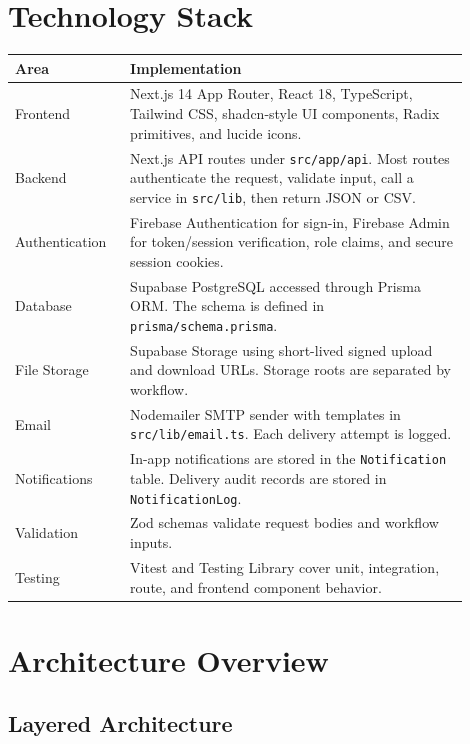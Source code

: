 \documentclass[11pt,a4paper]{article}
\newcommand{\code}[1]{\texttt{#1}}
\newcommand{\file}[1]{\texttt{#1}}
\begin{document}
\newpage

\section{Technology Stack}

\begin{longtable}{p{0.22\linewidth} p{0.68\linewidth}}
\toprule
\textbf{Area} & \textbf{Implementation} \\
\midrule
Frontend & Next.js 14 App Router, React 18, TypeScript, Tailwind CSS, shadcn-style UI components, Radix primitives, and lucide icons. \\
Backend & Next.js API routes under \file{src/app/api}. Most routes authenticate the request, validate input, call a service in \file{src/lib}, then return JSON or CSV. \\
Authentication & Firebase Authentication for sign-in, Firebase Admin for token/session verification, role claims, and secure session cookies. \\
Database & Supabase PostgreSQL accessed through Prisma ORM. The schema is defined in \file{prisma/schema.prisma}. \\
File Storage & Supabase Storage using short-lived signed upload and download URLs. Storage roots are separated by workflow. \\
Email & Nodemailer SMTP sender with templates in \file{src/lib/email.ts}. Each delivery attempt is logged. \\
Notifications & In-app notifications are stored in the \code{Notification} table. Delivery audit records are stored in \code{NotificationLog}. \\
Validation & Zod schemas validate request bodies and workflow inputs. \\
Testing & Vitest and Testing Library cover unit, integration, route, and frontend component behavior. \\
\bottomrule
\end{longtable}

\section{Architecture Overview}

\subsection{Layered Architecture}
\end{document}
